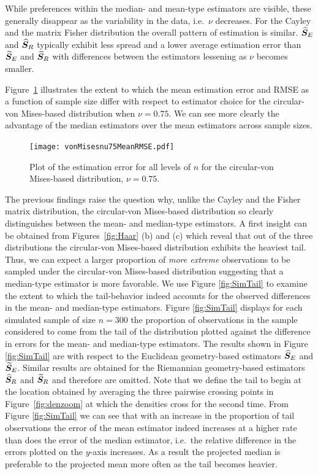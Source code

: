 While preferences within the median- and mean-type estimators are visible, these generally disappear as the variability in the data, i.e.~$\nu$ decreases.  For the Cayley and the matrix Fisher distribution the overall pattern of estimation is similar. ${\widehat{\bm S}_E}$ and ${\widehat{\bm S}_R}$ typically exhibit less spread and a lower average estimation error than ${\widetilde{\bm S}_E}$ and ${\widetilde{\bm S}_R}$ with differences between the estimators lessening as $\nu$ becomes smaller.

Figure~\ref{fig:vmnu75} illustrates the extent to which the mean estimation error and RMSE as a function of sample size differ with respect to estimator choice for the circular-von Mises-based distribution when $\nu=0.75$.  We can see more clearly the advantage of the median estimators over the mean estimators across sample sizes.
 \vspace{-1em}\begin{figure}[h!]
\centering
\texttt{[image: vonMisesnu75MeanRMSE.pdf]}\vspace{-1em}
\caption{Plot of the estimation error for all levels of $n$ for the circular-von Mises-based distribution,  $\nu=0.75$.}  \label{fig:vmnu75}
\end{figure}\vspace{-1em}

The previous findings raise the question why, unlike the Cayley and the Fisher matrix distribution, the circular-von Mises-based distribution so clearly distinguishes between the mean- and median-type estimators. A first insight can be obtained from Figures~\ref{fig:Haar} (b) and (c) which reveal that out of the three distributions the circular-von Mises-based distribution exhibits the heaviest tail. Thus, we can expect a larger proportion of   \textit{more extreme} observations to be sampled under the circular-von Mises-based distribution suggesting that a median-type estimator is more favorable. 
We use Figure \ref{fig:SimTail} to examine the extent to which the tail-behavior indeed accounts for the observed differences in the mean- and median-type estimators. Figure \ref{fig:SimTail} displays for each simulated sample of size $n=300$ the proportion of observations in the sample considered to come from the tail of the distribution plotted against the difference in errors for the mean- and median-type estimators.  The results shown in Figure \ref{fig:SimTail} are with respect to the Euclidean geometry-based estimators ${\widehat{\bm S}_E}$ and ${\widetilde{\bm S}_E}$. Similar results are obtained for the Riemannian geometry-based estimators ${\widehat{\bm S}_R}$ and ${\widetilde{\bm S}_R}$ and therefore are omitted. Note that we define the tail to begin at the location obtained by averaging the three pairwise crossing points in Figure~\ref{fig:denzoom} at which the densities cross for the second time. From Figure \ref{fig:SimTail} we can see that with an increase in the proportion of tail observations the error of the mean estimator indeed increases at a higher rate than does the error of the median estimator, i.e.~the relative difference in the errors plotted on the $y$-axis increases. As a result the projected median is preferable to the projected mean more often as the tail becomes heavier.\\
 
